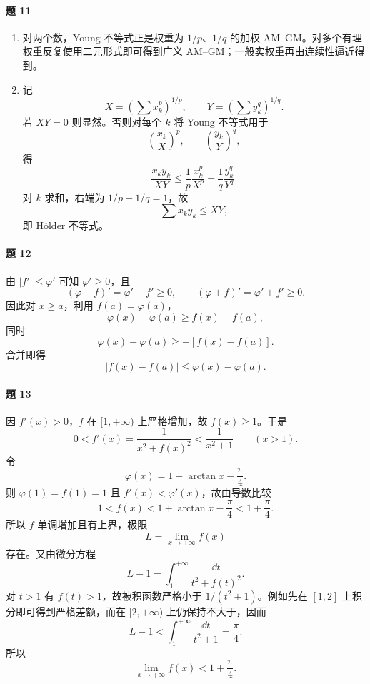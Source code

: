 \paragraph{题 11}
\begin{xsolution}
\begin{enumerate}[label=(\arabic*)]
  \item 对两个数，Young 不等式正是权重为 $1/p$、$1/q$ 的加权 AM--GM。对多个有理权重反复使用二元形式即可得到广义 AM--GM；一般实权重再由连续性逼近得到。

  \item 记
  \[
    X=\left(\sum x_k^p\right)^{1/p},
    \qquad
    Y=\left(\sum y_k^q\right)^{1/q}.
  \]
  若 $XY=0$ 则显然。否则对每个 $k$ 将 Young 不等式用于
  \[
    \left(\frac{x_k}{X}\right)^p,
    \qquad
    \left(\frac{y_k}{Y}\right)^q,
  \]
  得
  \[
    \frac{x_ky_k}{XY}
    \le\frac1p\frac{x_k^p}{X^p}
       +\frac1q\frac{y_k^q}{Y^q}.
  \]
  对 $k$ 求和，右端为 $1/p+1/q=1$，故
  \[
    \sum x_ky_k\le XY,
  \]
  即 Hölder 不等式。
\end{enumerate}
\end{xsolution}

\paragraph{题 12}
\begin{xsolution}
由 $|f'|\le\varphi'$ 可知 $\varphi'\ge0$，且
\[
  (\varphi-f)'=\varphi'-f'\ge0,
  \qquad
  (\varphi+f)'=\varphi'+f'\ge0.
\]
因此对 $x\ge a$，利用 $f(a)=\varphi(a)$，
\[
  \varphi(x)-\varphi(a)\ge f(x)-f(a),
\]
同时
\[
  \varphi(x)-\varphi(a)\ge-[f(x)-f(a)].
\]
合并即得
\[
  |f(x)-f(a)|\le\varphi(x)-\varphi(a).
\]
\end{xsolution}

\paragraph{题 13}
\begin{xsolution}
因 $f'(x)>0$，$f$ 在 $[1,+\infty)$ 上严格增加，故 $f(x)\ge1$。于是
\[
  0<f'(x)=\frac1{x^2+f(x)^2}<\frac1{x^2+1}\qquad(x>1).
\]
令
\[
  \varphi(x)=1+\arctan x-\frac\pi4.
\]
则 $\varphi(1)=f(1)=1$ 且 $f'(x)<\varphi'(x)$，故由导数比较
\[
  1<f(x)<1+\arctan x-\frac\pi4<1+\frac\pi4.
\]
所以 $f$ 单调增加且有上界，极限
\[
  L=\lim_{x\to+\infty}f(x)
\]
存在。又由微分方程
\[
  L-1
  =\int_1^{+\infty}\frac{\dd t}{t^2+f(t)^2}.
\]
对 $t>1$ 有 $f(t)>1$，故被积函数严格小于 $1/(t^2+1)$。例如先在 $[1,2]$ 上积分即可得到严格差额，而在 $[2,+\infty)$ 上仍保持不大于，因而
\[
  L-1
  <\int_1^{+\infty}\frac{\dd t}{t^2+1}
  =\frac\pi4.
\]
所以
\[
  \boxed{\displaystyle\lim_{x\to+\infty}f(x)<1+\frac\pi4}.
\]
\end{xsolution}

